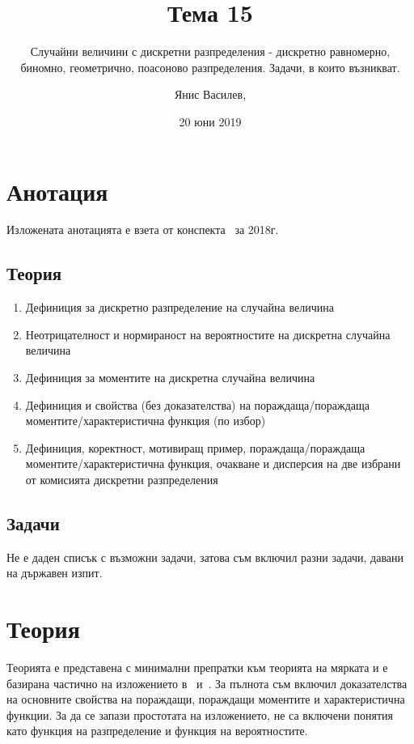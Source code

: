 \documentclass[numbers=endperiod, DIV=15, bibliography=totocnumbered]{scrartcl}
\title{Тема 15}
\subtitle{Случайни величини с дискретни разпределения - дискретно равномерно, биномно, геометрично, поасоново разпределения. Задачи, в които възникват.}
\author{Янис Василев, \Email{ianis@ivasilev.net}}
\date{20 юни 2019}
\begin{document}
\maketitle

\section{Анотация}

Изложената анотацията е взета от конспекта~\cite{Syllabus} за 2018г.

\subsection{Теория}

\begin{enumerate}
  \item Дефиниция за дискретно разпределение на случайна величина
  \item Неотрицателност и нормираност на вероятностите на дискретна случайна величина
  \item Дефиниция за моментите на дискретна случайна величина
  \item Дефиниция и свойства (без доказателства) на пораждаща/пораждаща моментите/характеристична функция (по избор)
  \item Дефиниция, коректност, мотивиращ пример, пораждаща/пораждаща моментите/характеристична функция, очакване и дисперсия на две избрани от комисията дискретни разпределения
\end{enumerate}

\subsection{Задачи}

Не е даден списък с възможни задачи, затова съм включил разни задачи, давани на държавен изпит.

\section{Теория}

Теорията е представена с минимални препратки към теорията на мярката и е базирана частично на изложението в~\cite{Borovkov} и~\cite{DimitrovYanev}. За пълнота съм включил доказателства на основните свойства на пораждащи, пораждащи моментите и характеристична функции. За да се запази простотата на изложението, не са включени понятия като функция на разпределение и функция на вероятностите.
\end{document}
